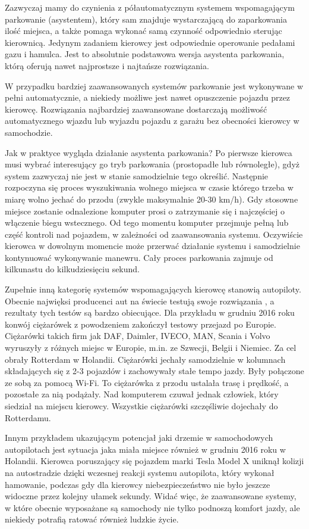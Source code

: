 \documentclass[a4paper,11pt,twoside]{report}
\theoremstyle{definition}
\begin{document}
Zazwyczaj mamy do czynienia z półautomatycznym systemem wspomagającym parkowanie (asystentem), który sam znajduje  wystarczającą do zaparkowania ilość miejsca, a także pomaga wykonać samą czynność odpowiednio sterując kierownicą. Jedynym zadaniem kierowcy jest odpowiednie operowanie pedałami gazu i hamulca. Jest to absolutnie podstawowa wersja asystenta parkowania, którą oferują nawet najprostsze i najtańsze rozwiązania. 


W przypadku bardziej zaawansowanych systemów parkowanie jest wykonywane w pełni automatycznie, a niekiedy możliwe jest nawet opuszczenie pojazdu przez kierowcę. Rozwiązania najbardziej zaawansowane dostarczają możliwość automatycznego wjazdu lub wyjazdu pojazdu z garażu bez obecności kierowcy w samochodzie.

Jak w praktyce wygląda działanie asystenta parkowania? Po pierwsze kierowca musi wybrać interesujący go tryb parkowania (prostopadłe lub równoległe), gdyż system zazwyczaj nie jest w stanie samodzielnie tego określić. Następnie rozpoczyna się proces wyszukiwania wolnego miejsca w czasie którego trzeba w miarę wolno jechać do przodu (zwykle maksymalnie 20-30 km/h). Gdy stosowne miejsce zostanie odnalezione komputer prosi o zatrzymanie się i najczęściej o włączenie biegu wstecznego. Od tego momentu komputer przejmuje pełną lub część kontroli nad pojazdem, w zależności od zaawansowania systemu. Oczywiście kierowca w dowolnym momencie może przerwać działanie systemu i samodzielnie kontynuować wykonywanie manewru. Cały proces parkowania zajmuje od kilkunastu do kilkudziesięciu sekund.

Zupełnie inną kategorię systemów wspomagających kierowcę stanowią autopiloty. Obecnie najwięksi producenci aut na świecie testują swoje rozwiązania , a rezultaty tych testów są bardzo obiecujące. Dla przykładu w grudniu 2016 roku konwój ciężarówek z powodzeniem zakończył testowy przejazd po Europie. Ciężarówki takich firm jak DAF, Daimler, IVECO, MAN, Scania i Volvo wyruszyły z różnych miejsc w Europie, m.in. ze Szwecji, Belgii i Niemiec. Za cel obrały Rotterdam w Holandii. Ciężarówki jechały samodzielnie w kolumnach składających się z 2-3 pojazdów i zachowywały stałe tempo jazdy. Były połączone ze sobą za pomocą Wi-Fi. To ciężarówka z przodu ustalała trasę i prędkość, a pozostałe za nią podążały. Nad komputerem czuwał jednak człowiek, który siedział na miejscu kierowcy. Wszystkie ciężarówki szczęśliwie dojechały do Rotterdamu. 

Innym przykładem ukazującym potencjał jaki drzemie w samochodowych autopilotach jest sytuacja jaka miała miejsce również w grudniu 2016 roku w Holandii. Kierowca poruszający się pojazdem marki Tesla Model X uniknął kolizji na autostradzie dzięki wczesnej reakcji systemu autopilota, który wykonał hamowanie, podczas gdy dla kierowcy niebezpieczeństwo nie było jeszcze widoczne przez kolejny ułamek sekundy. Widać więc, że zaawansowane systemy, w które obecnie wyposażane są samochody nie tylko podnoszą komfort jazdy, ale niekiedy potrafią ratować również ludzkie życie.
\end{document}
